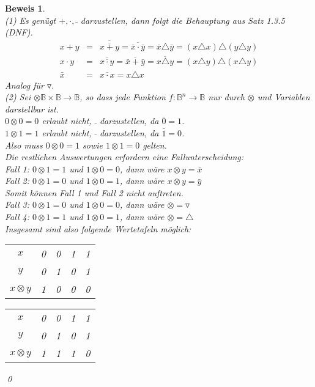 \documentclass[ngerman]{scrartcl}
\theoremstyle{custom}
\newtheorem*{bw}{Beweis}
\newcommand{\0}{\mathbf{0}}
\newcommand{\1}{\mathbf{L}}
\begin{document}
\begin{bw} ~\\
(1) Es gen\"ugt $+, \cdot, \bar~$ darzustellen, dann folgt die
Behauptung aus Satz 1.3.5 (DNF).
\begin{eqnarray}
x+y &=& \overline{\overline{x + y}} = \overline{\bar x \cdot \bar y} =
\bar x \triangle \bar y = (x \triangle x) \triangle (y \triangle y)\\
x \cdot y &=& \overline{\overline{x \cdot y}} = \overline{\bar x +
  \bar y} = \overline{x \triangle y} = (x \triangle y) \triangle (x
\triangle y)\\
\bar x &=& \overline{x \cdot x} = x \triangle x
\end{eqnarray}
Analog f\"ur $\triangledown$.\\
(2) Sei $\otimes \mathds{B} \times \mathds{B} \rightarrow \mathds{B}$,
so dass jede Funktion $f: \mathds{B}^n \rightarrow \mathds{B}$ nur
durch $\otimes$ und Variablen darstellbar ist.\\
$0 \otimes 0 = 0$ erlaubt nicht, $\bar ~$ darzustellen, da $\bar 0 =
1$. \\
$1 \otimes 1 = 1$ erlaubt nicht, $\bar ~$ darzustellen, da $\bar 1
= 0$.\\
Also muss $0 \otimes 0 = 1$ sowie $1 \otimes 1 = 0$ gelten.\\

Die restlichen Auswertungen erfordern eine Fallunterscheidung:\\
Fall 1: $0 \otimes 1 = 1$ und $1 \otimes 0 = 0$, dann w\"are $x \otimes
y = \bar x$\\
Fall 2: $0 \otimes 1 = 0$ und $1 \otimes 0 = 1$, dann w\"are $x \otimes
y = \bar y$\\
Somit k\"onnen Fall 1 und Fall 2 nicht auftreten.\\

Fall 3: $0 \otimes 1 = 0$ und $1 \otimes 0 = 0$, dann w\"are $\otimes =
\triangledown$\\
Fall 4: $0 \otimes 1 = 1$ und $1 \otimes 0 = 1$, dann w\"are $\otimes
= \triangle$\\

Insgesamt sind also folgende Wertetafeln m\"oglich: \\
\begin{tabular}{c|cccc}
$x$ & 0 & 0 & 1 & 1 \\
$y$ & 0 & 1 & 0 & 1 \\
\hline $x \otimes y$ & 1 & 0 & 0 & 0
\end{tabular}
\begin{tabular}{c|cccc}
$x$ & 0 & 0 & 1 & 1 \\
$y$ & 0 & 1 & 0 & 1 \\
\hline $x \otimes y$ & 1 & 1 & 1 & 0
\end{tabular}
\qed
\end{bw}
\end{document}
